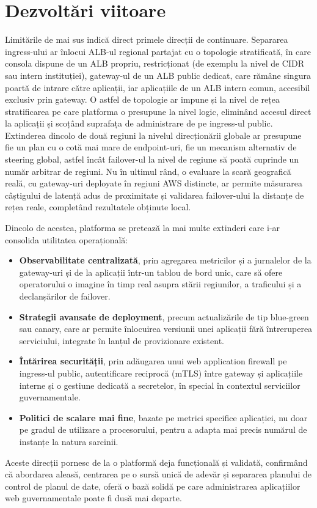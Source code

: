\documentclass[12pt,a4paper]{report}
\begin{document}
\section{Dezvoltări viitoare}
Limitările de mai sus indică direct primele direcții de continuare. Separarea ingress-ului ar înlocui ALB-ul regional partajat cu o topologie stratificată, în care consola dispune de un ALB propriu, restricționat (de exemplu la nivel de CIDR sau intern instituției), gateway-ul de un ALB public dedicat, care rămâne singura poartă de intrare către aplicații, iar aplicațiile de un ALB intern comun, accesibil exclusiv prin gateway. O astfel de topologie ar impune și la nivel de rețea stratificarea pe care platforma o presupune la nivel logic, eliminând accesul direct la aplicații și scoțând suprafața de administrare de pe ingress-ul public. Extinderea dincolo de două regiuni la nivelul direcționării globale ar presupune fie un plan cu o cotă mai mare de endpoint-uri, fie un mecanism alternativ de steering global, astfel încât failover-ul la nivel de regiune să poată cuprinde un număr arbitrar de regiuni. Nu în ultimul rând, o evaluare la scară geografică reală, cu gateway-uri deployate în regiuni AWS distincte, ar permite măsurarea câștigului de latență adus de proximitate și validarea failover-ului la distanțe de rețea reale, completând rezultatele obținute local.

Dincolo de acestea, platforma se pretează la mai multe extinderi care i-ar consolida utilitatea operațională:

\begin{itemize}
	\item \textbf{Observabilitate centralizată}, prin agregarea metricilor și a jurnalelor de la gateway-uri și de la aplicații într-un tablou de bord unic, care să ofere operatorului o imagine în timp real asupra stării regiunilor, a traficului și a declanșărilor de failover.
	\item \textbf{Strategii avansate de deployment}, precum actualizările de tip blue-green sau canary, care ar permite înlocuirea versiunii unei aplicații fără întreruperea serviciului, integrate în lanțul de provizionare existent.
	\item \textbf{Întărirea securității}, prin adăugarea unui web application firewall pe ingress-ul public, autentificare reciprocă (mTLS) între gateway și aplicațiile interne și o gestiune dedicată a secretelor, în special în contextul serviciilor guvernamentale.
	\item \textbf{Politici de scalare mai fine}, bazate pe metrici specifice aplicației, nu doar pe gradul de utilizare a procesorului, pentru a adapta mai precis numărul de instanțe la natura sarcinii.
\end{itemize}

Aceste direcții pornesc de la o platformă deja funcțională și validată, confirmând că abordarea aleasă, centrarea pe o sursă unică de adevăr și separarea planului de control de planul de date, oferă o bază solidă pe care administrarea aplicațiilor web guvernamentale poate fi dusă mai departe.



\end{document}
